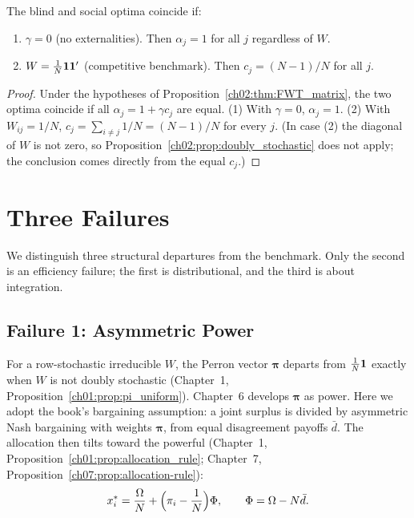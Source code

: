 \documentclass[../structural_economics_book.tex]{subfiles}
\begin{document}
\begin{corollary}\label{ch02:cor:sufficient}
The blind and social optima coincide if:
\begin{enumerate}
\item $\gamma = 0$ (no externalities). Then $\alpha_j = 1$ for all $j$ regardless of $W$.
\item $W = \frac{1}{N}\mathbf{1}\mathbf{1}'$ (competitive benchmark). Then $c_j = (N-1)/N$ for all $j$.
\end{enumerate}
\end{corollary}

\begin{proof}
Under the hypotheses of Proposition~\ref{ch02:thm:FWT_matrix}, the two optima coincide if all $\alpha_j = 1 + \gamma c_j$ are equal. (1) With $\gamma = 0$, $\alpha_j = 1$. (2) With $W_{ij} = 1/N$, $c_j = \sum_{i \neq j} 1/N = (N-1)/N$ for every $j$. (In case (2) the diagonal of $W$ is not zero, so Proposition~\ref{ch02:prop:doubly_stochastic} does not apply; the conclusion comes directly from the equal $c_j$.)
\end{proof}


\section{Three Failures}
\label{ch02:sec:failures}

We distinguish three structural departures from the benchmark. Only the second is an efficiency failure; the first is distributional, and the third is about integration.

\subsection{Failure 1: Asymmetric Power}

For a row-stochastic irreducible $W$, the Perron vector $\boldsymbol{\pi}$ departs from $\frac{1}{N}\mathbf{1}$ exactly when $W$ is not doubly stochastic (Chapter~1, Proposition~\ref{ch01:prop:pi_uniform}). Chapter~6 develops $\boldsymbol{\pi}$ as power. Here we adopt the book's bargaining assumption: a joint surplus is divided by asymmetric Nash bargaining with weights $\boldsymbol{\pi}$, from equal disagreement payoffs $\bar d$. The allocation then tilts toward the powerful (Chapter~1, Proposition~\ref{ch01:prop:allocation_rule}; Chapter~7, Proposition~\ref{ch07:prop:allocation-rule}):
\begin{equation}\label{ch02:eq:power_correction}
x_i^* = \frac{\Omega}{N} + \Bigl(\pi_i - \frac{1}{N}\Bigr)\Phi, \qquad \Phi = \Omega - N\bar d.
\end{equation}
\end{document}
